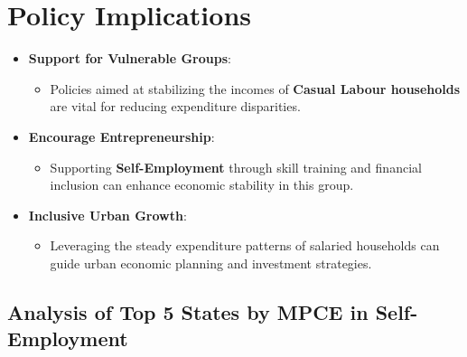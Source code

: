 \documentclass{article}
\begin{document}
\section*{Policy Implications}

\begin{itemize}
	\item \textbf{Support for Vulnerable Groups}:
	\begin{itemize}
		\item Policies aimed at stabilizing the incomes of \textbf{Casual Labour households} are vital for reducing expenditure disparities.
	\end{itemize}
	\item \textbf{Encourage Entrepreneurship}:
	\begin{itemize}
		\item Supporting \textbf{Self-Employment} through skill training and financial inclusion can enhance economic stability in this group.
	\end{itemize}
	\item \textbf{Inclusive Urban Growth}:
	\begin{itemize}
		\item Leveraging the steady expenditure patterns of salaried households can guide urban economic planning and investment strategies.
	\end{itemize}
\end{itemize}





\newpage





\subsection{Analysis of Top 5 States by MPCE in Self-Employment}
\end{document}
